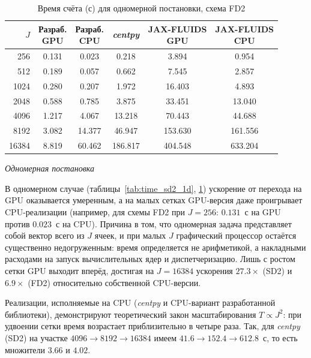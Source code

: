 \documentclass[a4paper,14pt]{extarticle}
\theoremstyle{theorem}
\theoremstyle{lemma}
\begin{document}
\begin{table}[!htb]
    \centering
    \caption{Время счёта (с) для одномерной постановки, схема FD2}
    \vspace{0.1cm}
    \label{tab:time_fd2_1d}
    \begin{tabular}{rccccc}
        \hline
        $J$ & \makecell{Разраб.\\GPU} & \makecell{Разраб.\\CPU} & \textit{centpy} & \makecell{JAX-FLUIDS\\GPU} & \makecell{JAX-FLUIDS\\CPU} \\
        \hline
        256   & 0.131 & 0.023  & 0.218   & 3.894   & 0.954   \\
        512   & 0.189 & 0.057  & 0.662   & 7.545   & 2.857   \\
        1024  & 0.280 & 0.207  & 1.972   & 16.403  & 4.893   \\
        2048  & 0.588 & 0.785  & 3.875   & 33.451  & 13.040  \\
        4096  & 1.217 & 4.067  & 13.218  & 70.443  & 44.688  \\
        8192  & 3.082 & 14.377 & 46.947  & 153.630 & 161.556 \\
        16384 & 8.819 & 60.462 & 186.817 & 404.548 & 633.204 \\
        \hline
    \end{tabular}
\end{table}

\textit{Одномерная постановка}

В одномерном случае (таблицы~\ref{tab:time_sd2_1d}, \ref{tab:time_fd2_1d})
ускорение от перехода на GPU оказывается умеренным, а на малых сетках GPU-версия
даже проигрывает CPU-реализации (например, для схемы FD2 при $J=256$: $0.131$~с на
GPU против $0.023$~с на CPU). Причина в том, что одномерная задача представляет
собой вектор всего из $J$ ячеек, и при малых $J$ графический процессор остаётся
существенно недогруженным: время определяется не арифметикой, а накладными
расходами на запуск вычислительных ядер и диспетчеризацию. Лишь с ростом сетки
GPU выходит вперёд, достигая на $J=16384$ ускорения $27.3\times$ (SD2) и
$6.9\times$ (FD2) относительно собственной CPU-версии.

Реализации, исполняемые на CPU (\textit{centpy} и CPU-вариант разработанной
библиотеки), демонстрируют теоретический закон масштабирования $T \propto J^2$:
при удвоении сетки время возрастает приблизительно в четыре раза. Так, для
\textit{centpy} (SD2) на участке $4096 \to 8192 \to 16384$ имеем
$41.6 \to 152.4 \to 612.8$~с, то есть множители $3.66$ и $4.02$.
\end{document}
